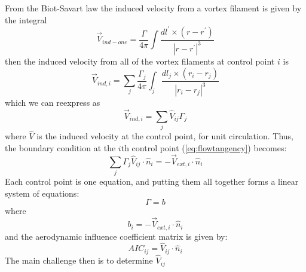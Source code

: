 \documentclass{article}
\begin{document}
From the Biot-Savart law the induced velocity from a vortex filament is given by the integral
\begin{equation}
    \vec{V}_{ind-one} = \frac{\Gamma}{4\pi}\int \frac{dl^\prime \times (r - r^\prime)}{|r - r^\prime|^3}
\end{equation}
then the induced velocity from all of the vortex filaments at control point $i$ is
\begin{equation}
    \vec{V}_{ind, i} = \sum_j \frac{\Gamma_j}{4\pi}\int_j \frac{dl_j \times (r_i - r_j)}{|r_i - r_j|^3}
\end{equation}
which we can reexpress as
\begin{equation}
    \vec{V}_{ind, i} = \sum_j \hat{V}_{ij} \Gamma_j
\end{equation}
where $\hat{V}$ is the induced velocity at the control point, for unit circulation.  Thus, the boundary condition at the $i$th control point (\cref{eq:flowtangency}) becomes:
\begin{equation}
\sum_j \Gamma_j \hat{V}_{ij} \cdot \hat{n}_{i} = - \vec V_{ext,i} \cdot \hat{n}_{i}
\end{equation}
Each control point is one equation, and putting them all together forms a linear system of equations:
\begin{equation}
[AIC] \Gamma = b 
\end{equation}
where 
\begin{equation}
b_i = - \vec V_{ext, i} \cdot \hat{n}_{i}
\end{equation}
and the aerodynamic influence coefficient matrix is given by:
\begin{equation}
AIC_{ij} = \hat{V}_{ij} \cdot \hat{n}_{i}
\end{equation}
The main challenge then is to determine $\hat{V}_{ij}$
\end{document}
